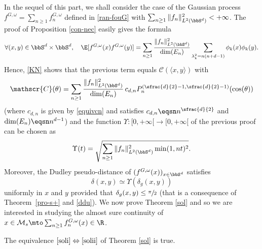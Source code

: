 In the sequel of this part, we shall consider the case of the Gaussian process $f^{G,\omega}=\sum_{n\geq 1}f_n^{G,\omega}$ defined in \eqref{ran-fouG} with $\sum_{n\geq 1} \|f_n\|_{L^2(\bbS^d)}^2<+\infty$. The proof of Proposition \ref{con-nec} easily gives the formula
\begin{equation*}
\forall (x,y)\in \bbS^d\times \bbS^d, \quad \E[f^{G,\omega}(x)f^{G,\omega}(y)]=\sum_{n\geq 1} \frac{\|f_n\|_{L^2(\bbS^d)}^2}{\dim(E_n)} \sum_{\lambda_k^2=n(n+d-1)} \phi_k(x)\phi_k(y).
\end{equation*}
Hence, \eqref{KN} shows that the previous term equals $\mathscr{C}(\langle x,y\rangle)$ with
\begin{equation*}
\mathscr{C}(\theta)=\sum_{n\geq 1}\frac{\|f_n\|_{L^2(\bbS^d)}^2}{\dim(E_n)}\, c_{d,n} P_n^{(\sfrac{d}{2}-1,\sfrac{d}{2}-1)}(\cos(\theta))
\end{equation*}
(where $c_{d,n}$ is given by \eqref{equivcn} and satisfies $c_{d,n}\eqsn n^{\sfrac{d}{2}}$ and $\dim(E_n)\eqsn n^{d-1}$) and the function $\Upsilon:[0,+\infty[\to [0,+\infty[$ of the previous proof can be chosen as
\begin{equation*}
\Upsilon(t)=\sqrt{\sum_{n\geq 1} \|f_n\|_{L^2(\bbS^d)}^2 \min(1,nt)^2}.
\end{equation*}
Moreover, the Dudley pseudo-distance of $(f^{G,\omega}(x))_{x\in \bbS^d}$ satisfies
\begin{equation}\label{dudd}
\delta(x,y)\simeq \Upsilon(\delta_g(x,y))
\end{equation}
uniformly in $x$ and $y$ provided that $\delta_g(x,y)\leq\sfrac{\pi}{2}$ (that is a consequence of Theorem~\ref{pro-s+} and \eqref{ddu}).
We now prove Theorem \ref{sol} and so we are interested in studying the almost sure continuity of $x\in \mathcal{M}_s\mto \sum_{n\geq 1}f_n^{G,\omega}(x)\in \R$.

\begin{prop}\label{ieii}
The equivalence $\eqref{soli}\Leftrightarrow\eqref{solii}$ of Theorem \ref{sol} is true.
\end{prop}

